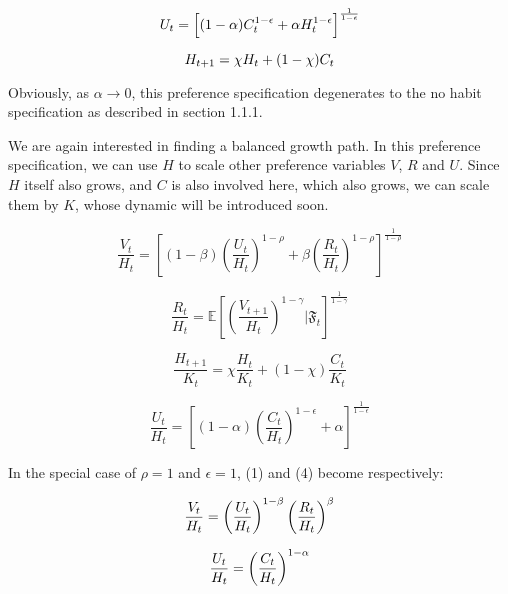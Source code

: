 \documentclass{article}
\theoremstyle{exampstyle}
\begin{document}
\begin{equation}\notag
U_t = \left[(1-\alpha)C_t^{1-\epsilon}+\alpha H_t^{1-\epsilon}\right]^{\frac{1}{1-\epsilon}}
\end{equation}

\begin{equation}\notag
H_{t+1}  = \chi H_t + (1-\chi) C_t
\end{equation}

Obviously, as $\alpha \to 0$, this preference specification degenerates to the no habit specification as described in section 1.1.1.

We are again interested in finding a balanced growth path. In this preference specification, we can use $H$ to scale other preference variables $V$, $R$ and $U$. Since $H$ itself also grows, and $C$ is also involved here, which also grows, we can scale them by $K$, whose dynamic will be introduced soon.


\begin{equation}
\frac{V_t}{H_t} = \left[(1-\beta)\left(\frac{U_t}{H_t}\right)^{1-\rho}+\beta\left(\frac{R_t}{H_t}\right)^{1-\rho}\right]^{\frac{1}{1-\rho}} \tag{1}
\end{equation}

\begin{equation}
\frac{R_t}{H_t} = \mathbb{E}\left[\left(\frac{V_{t+1}}{H_t}\right)^{1-\gamma} | {\mathfrak F}_t\right]^{\frac{1}{1-\gamma}} \tag{2}
\end{equation}

\begin{equation}
\frac{H_{t+1}}{K_t}  = \chi \frac{H_t}{K_t} + (1-\chi) \frac{C_t}{K_t} \tag{3}
\end{equation}

\begin{equation}
\frac{U_t}{H_t} = \left[(1-\alpha)\left(\frac{C_t}{H_t}\right)^{1-\epsilon}+\alpha\right]^{\frac{1}{1-\epsilon}} \tag{4}
\end{equation}

In the special case of $\rho = 1$ and $\epsilon = 1$, (1) and (4) become respectively:

\begin{equation}\notag
\frac{V_t}{H_t} = \left(\frac{U_t}{H_t}\right)^{1-\beta} \left(\frac{R_t}{H_t}\right)^{\beta}
\end{equation}

\begin{equation}\notag
\frac{U_t}{H_t} = \left(\frac{C_t}{H_t}\right)^{1-\alpha}
\end{equation}
\end{document}
